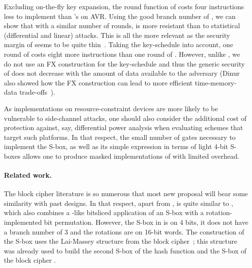 Excluding on-the-fly key expansion, the round function of \fly costs four instructions less to implement than \pride's on AVR. Using the
good branch number of \littlunOne, we can show that with a similar number of rounds, \fly is more resistant than \pride
to statistical (differential and linear) attacks. This is all the more relevant as the security margin of \pride seems to be quite
thin~\cite{prideattack}. Taking the key-schedule into account, one round of \fly costs eight more instructions
than one round of \pride. However, unlike \pride, we do not use an FX construction for the key-schedule and thus
the generic security of \fly does not decrease with the amount of data available
to the adversary (Dinur also showed how the FX construction can lead to more efficient time-memory-data trade-offs~\cite{itaitmd}).

As implementations on resource-constraint devices are more likely to be vulnerable to side-channel attacks, one should also consider
the additional cost of protection against, say, differential power analysis when evaluating schemes that target such platforms.
In that respect, the small number of gates
necessary to implement the \littlunOne S-box, as well as its simple expression in terms of light 4-bit S-boxes allows one to produce
masked implementations of \fly with limited overhead.

\paragraph{Related work.} The block cipher literature is so numerous that most new proposal will bear some similarity with past
designs. In that respect, apart from \present, \fly is quite similar to \rectangle \cite{rectangle}, which also combines a \serpent-like
bitsliced application of an S-box \cite{serpent} with a rotation-implemented bit permutation. However, the S-box in \rectangle is on 4 bits, it does
not have a branch number of 3 and the rotations are on 16-bit words. The construction of the \littlun S-box uses
the Lai-Massey structure from the \idea block cipher~\cite{idea}; this structure was already used to build the second S-box
of the \whirlpool hash function \cite{whirlpool} and the S-box of the block cipher \fox \cite{fox}.
